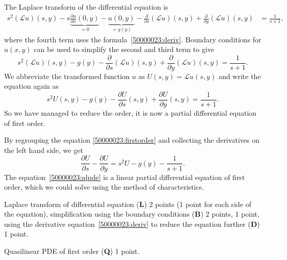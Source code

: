 \begin{loesung}
\begin{teilaufgaben}
\item
The Laplace transform of the differential equation is
\begin{align*}
s^2(\mathcal{L}u)(s,y)
-
s\underbrace{\frac{\partial u}{\partial x}(0,y)}_{\textstyle=0}
-
\underbrace{u(0,y)}_{\textstyle=g(y)}
-\frac{\partial }{\partial s}(\mathcal{L}u)(s,y)
+
\frac{\partial }{\partial y}(\mathcal{L}u)(s,y)
&=
\frac1{s+1},
\end{align*}
where the fourth term uses the formula~\eqref{50000023:deriv}.
Boundary conditions for $u(x,y)$ can be used to simplify the
second and third term to give
\[
s^2(\mathcal{L}u)(s,y)-g(y) - \frac{\partial}{\partial s}(\mathcal{L}u)(s,y)
+
\frac{\partial}{\partial y}(\mathcal{L}u)(s,y)
=
\frac1{s+1}.
\]
We abbreviate the transformed function $u$ as $U(s,y) = \mathcal{L}u(s,y)$
and write the equation again as
\begin{equation}
s^2 U(s,y) - g(y) -\frac{\partial U}{\partial s}(s,y)
+ \frac{\partial U}{\partial y}(s,y)
=
\frac1{s+1}.
\label{50000023:firstorder}
\end{equation}
So we have managed to reduce the order, it is now a partial differential
equation of first order.
\item
By regrouping the equation \eqref{50000023:firstorder}  and collecting
the derivatives on the left hand side, we get
\begin{equation}
\frac{\partial U}{\partial s} - \frac{\partial U}{\partial y}
=
s^2 U - g(y) - \frac{1}{s+1}.
\label{50000023:qlpde}
\end{equation}
The equation~\eqref{50000023:qlpde} is a linear partial differential
equation of first order, which we could solve using the method of
characteristics.
\qedhere
\end{teilaufgaben}
\end{loesung}


\begin{bewertung}
\begin{teilaufgaben}
\item
Laplace transform of differential equation ({\bf L}) 2 points (1 point
for each side of the equation),
simplification using the boundary conditions ({\bf B}) 2 points,
1 point,
using the derivative equation~\eqref{50000023:deriv} to reduce the
equation further ({\bf D}) 1 point.
\item
Quasilinear PDE of first order ({\bf Q}) 1 point.
\end{teilaufgaben}
\end{bewertung}

